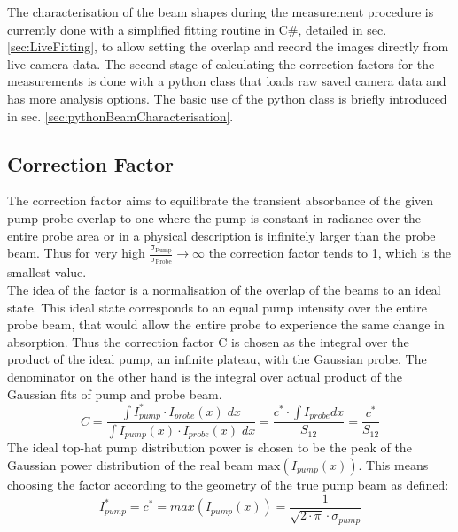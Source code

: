 \documentclass[twoside,openright]{scrreprt}
\begin{document}
{The characterisation of the beam shapes during the measurement procedure is currently done with a simplified fitting routine in C\#, detailed in sec. \ref{sec:LiveFitting}, to allow setting the overlap and record the images directly from live camera data. The second stage of calculating the correction factors for the measurements is done with a python class that loads raw saved camera data and has more analysis options. The basic use of the python class is briefly introduced in sec. \ref{sec:pythonBeamCharacterisation}.

\subsection{Correction Factor}\label{sec:CorrFactor}
The correction factor aims to equilibrate the transient absorbance of the given pump-probe overlap to one where the pump is constant in radiance over the entire probe area or in a physical description is infinitely larger than the probe beam. 
Thus for very high $\mathrm{\frac{\sigma_{Pump}}{\sigma_{Probe}} \rightarrow \infty}$ the correction factor tends to 1, which is the smallest value.\\
The idea of the factor is a normalisation of the overlap of the beams to an ideal state. This ideal state corresponds to an equal pump intensity over the entire probe beam, that would allow the entire probe to experience the same change in absorption. Thus the correction factor C is chosen as the integral over the product of the ideal pump, an infinite plateau, with the Gaussian probe. The denominator on the other hand is the integral over actual product of the Gaussian fits of pump and probe beam.
\begin{equation}\label{eq:CorrFactorGaussians}
C = \dfrac{\int I_{pump}^*\cdot I_{probe}(x) \;dx}{\int I_{pump}(x)\cdot I_{probe}(x) \; dx} = \dfrac{c^*\cdot \int I_{probe} dx}{S_{12}} = \dfrac{c^*}{S_{12}}
\end{equation}
The ideal top-hat pump distribution power is chosen to be the peak of the Gaussian power distribution of the real beam $\mathrm{max}\left(I_{pump}(x)\right)$. This means choosing the factor according to the geometry of the true pump beam as defined:
\begin{equation*}\label{eq:maxPowerGauss}
I_{pump}^* = c^* = max(I_{pump}(x)) = \frac{1}{\sqrt{2\cdot\pi}\cdot\sigma_{pump}}
\end{equation*}

}
\end{document}

